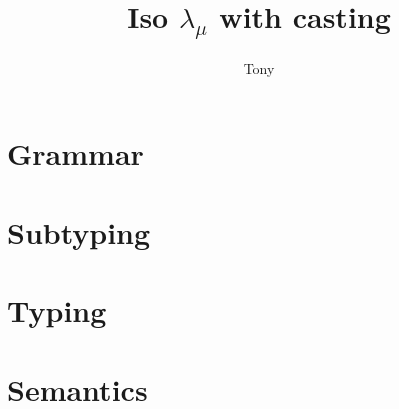 \documentclass[a4paper]{article}
\title{Iso $\mathsf{\lambda}_{\mu}$ with casting}
\author{Tony}
\begin{document}
\maketitle



\section{Grammar}

\ottgrammar

\section{Subtyping}

\ottdefnsWellFormedTypeEnv


\section{Typing}

\ottdefnsWellFormedTermEnv

\ottdefnsWellFormedType

\ottdefnsTypCast

\ottdefnsTyping



\section{Semantics}

\ottdefnsValues


\ottdefnsReduction
\end{document}
